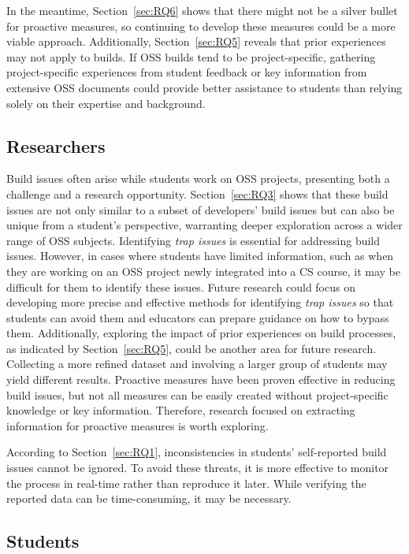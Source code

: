 \documentclass[10pt, conference]{IEEEtran}
\begin{document}
In the meantime, Section~\ref{sec:RQ6} shows that there might not be a silver bullet for proactive measures, so continuing to develop these measures could be a more viable approach. Additionally, Section~\ref{sec:RQ5} reveals that prior experiences may not apply to builds. If OSS builds tend to be project-specific, gathering project-specific experiences from student feedback or key information from extensive OSS documents could provide better assistance to students than relying solely on their expertise and background.

\subsection{Researchers}
Build issues often arise while students work on OSS projects, presenting both a challenge and a research opportunity. Section~\ref{sec:RQ3} shows that these build issues are not only similar to a subset of developers’ build issues but can also be unique from a student’s perspective, warranting deeper exploration across a wider range of OSS subjects. Identifying \textit{trap issues} is essential for addressing build issues. However, in cases where students have limited information, such as when they are working on an OSS project newly integrated into a CS course, it may be difficult for them to identify these issues. Future research could focus on developing more precise and effective methods for identifying \textit{trap issues} so that students can avoid them and educators can prepare guidance on how to bypass them. Additionally, exploring the impact of prior experiences on build processes, as indicated by Section~\ref{sec:RQ5}, could be another area for future research. Collecting a more refined dataset and involving a larger group of students may yield different results. Proactive measures have been proven effective in reducing build issues, but not all measures can be easily created without project-specific knowledge or key information. Therefore, research focused on extracting information for proactive measures is worth exploring.

According to Section~\ref{sec:RQ1}, inconsistencies in students’ self-reported build issues cannot be ignored. To avoid these threats, it is more effective to monitor the process in real-time rather than reproduce it later. While verifying the reported data can be time-consuming, it may be necessary.


\subsection{Students}
\end{document}
